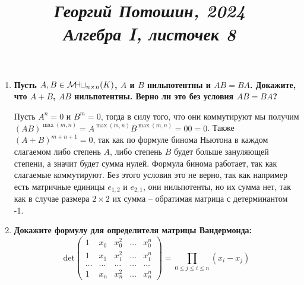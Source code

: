 \documentclass{article}
\title{
\textit{\small{Георгий Потошин, 2024}}\\
\vspace{0.3ex}
\textit{\huge{Алгебра I, листочек 8}}\vspace{1ex}
}
\date{\vspace{-10ex}}
\newcommand{\mymat}{\mathcal{M\mkern-3mu a\mkern-0.3mu t}}
\begin{document}
\maketitle

\begin{enumerate}
    \item \textbf{Пусть $A,B\in\mymat_{n\times n}(K)$, $A$ и $B$ нильпотентны и $AB=BA$. Докажите,
        что $A+B$, $AB$ нильпотентны. Верно ли это без условия $AB = BA$?}

        Пусть $A^n=0$ и $B^m=0$, тогда в силу того, что они коммутируют мы получим $(AB)^{\max(m,n)}=A^{\max(m,n)}
        B^{\max(m,n)}=00=0$. Также $(A+B)^{m+n+1}=0$, так как по формуле бинома Ньютона в каждом слагаемом либо степень
        $A$, либо степень $B$ будет больше зануляющей степени, а значит будет сумма нулей. Формула бинома работает, так
        как слагаемые коммутируют. Без этого условия это не верно, так как например есть матричные единицы $e_{1,2}$ и
        $e_{2,1}$, они нильпотенты, но их сумма нет, так как в случае размера $2\times 2$ их сумма – обратимая матрица
        с детерминантом -1.
        
    \item \textbf{Докажите формулу для определителя матрицы Вандермонда:}
        \[\text{det}\left(\begin{array}{ccccc}
            1 & x_0 & x_0^2 & \ldots & x_0^n\\
            1 & x_1 & x_1^2 & \ldots & x_1^n\\
            \ldots & \ldots & \ldots & \ldots & \ldots\\
            1 & x_n & x_n^2 & \ldots & x_n^n\end{array}
            \right)=\prod_{0\leq j\le i\leq n}(x_i-x_j)\]


\end{enumerate}
\end{document}
